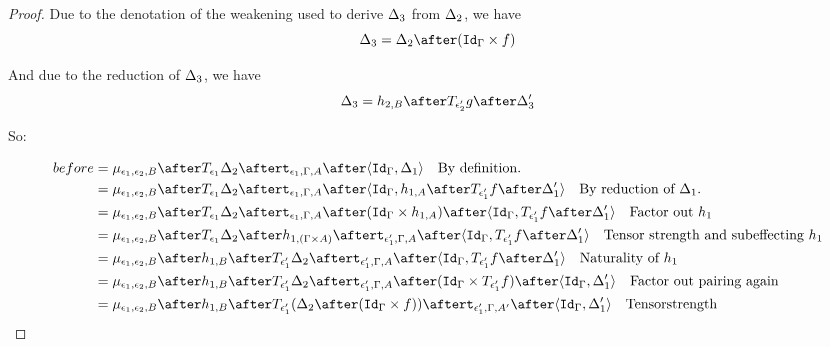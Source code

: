 \documentclass{report}
\begin{document}
\begin{framed}
\begin{proof}
                        Due to the denotation of the weakening used to derive $\Delta_3$ from $\Delta_2$, we have 
                        \begin{equation}
                            \D_3 = \D_2\after(\idg\times f)
                        \end{equation}
        
                        And due to the reduction of $\Delta_3$,
                        we have 
                        \begin{equation}
                            \D_3 = h_{2, B} \after \T{\e_2'}{g}\after \D_3'
                        \end{equation}
        
                        So:
        
                        \begin{align*}
                            before &= \bind{\e_1}{\e_2}{B}\after \T{\e_1}{\D_2}\after\tstrength{\e_1}{\G}{A}\after\pr{\idg}{\D_1}\qt{By definition.}\\
                            &= \bind{\e_1}{\e_2}{B}\after \T{\e_1}{\D_2}\after\tstrength{\e_1}{\G}{A}\after\pr{\idg}{h_{1, A}\after\T{\e_1'}{f}\after\D_1'}\qt{By reduction of $\D_1$.}\\
                            &= \bind{\e_1}{\e_2}{B}\after \T{\e_1}{\D_2}\after\tstrength{\e_1}{\G}{A}\after(\idg\times h_{1, A})\after\pr{\idg}{\T{\e_1'}{f}\after\D_1'}\qt{Factor out $h_1$}\\
                            &= \bind{\e_1}{\e_2}{B}\after \T{\e_1}{\D_2}\after
                            h_{1, (\G\times A)}\after
                            \tstrength{\e_1'}{\G}{A}\after\pr{\idg}{\T{\e_1'}{f}\after\D_1'}\qt{Tensor strength and subeffecting $h_1$}\\
                            &= \bind{\e_1}{\e_2}{B}\after 
                            h_{1, B}\after\T{\e_1'}{\D_2}\after
                            \tstrength{\e_1'}{\G}{A}\after\pr{\idg}{\T{\e_1'}{f}\after\D_1'}\qt{Naturality of $h_1$}\\
                            &= \bind{\e_1}{\e_2}{B}\after 
                            h_{1, B}\after\T{\e_1'}{\D_2}\after
                            \tstrength{\e_1'}{\G}{A}\after(\idg\times \T{\e_1'}{f})\after\pr{\idg}{\D_1'}\qt{Factor out pairing again}\\
                            &= \bind{\e_1}{\e_2}{B}\after 
                            h_{1, B}\after\T{\e_1'}{(\D_2\after(\idg\times f))}\after
                            \tstrength{\e_1'}{\G}{A'}\after\pr{\idg}{\D_1'}\qt{Tensorstrength}\\

\end{align*}
\end{proof}
\end{framed}
\end{document}
